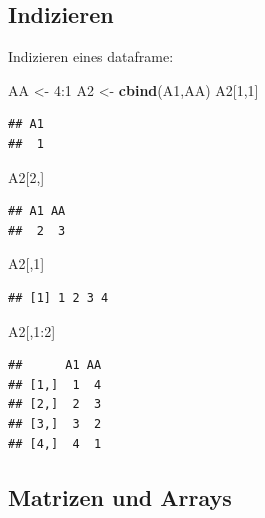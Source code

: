 \documentclass[]{article}
\newenvironment{Shaded}{\begin{snugshade}}{\end{snugshade}}
\newcommand{\KeywordTok}[1]{\textcolor[rgb]{0.13,0.29,0.53}{\textbf{{#1}}}}
\newcommand{\DecValTok}[1]{\textcolor[rgb]{0.00,0.00,0.81}{{#1}}}
\newcommand{\StringTok}[1]{\textcolor[rgb]{0.31,0.60,0.02}{{#1}}}
\newcommand{\NormalTok}[1]{{#1}}
\begin{document}
\subsection{Indizieren}\label{indizieren}

Indizieren eines dataframe:

\begin{Shaded}
\begin{Highlighting}[]
\NormalTok{AA <-}\StringTok{ }\DecValTok{4}\NormalTok{:}\DecValTok{1}
\NormalTok{A2 <-}\StringTok{ }\KeywordTok{cbind}\NormalTok{(A1,AA)}
\NormalTok{A2[}\DecValTok{1}\NormalTok{,}\DecValTok{1}\NormalTok{]}
\end{Highlighting}
\end{Shaded}

\begin{verbatim}
## A1 
##  1
\end{verbatim}

\begin{Shaded}
\begin{Highlighting}[]
\NormalTok{A2[}\DecValTok{2}\NormalTok{,]}
\end{Highlighting}
\end{Shaded}

\begin{verbatim}
## A1 AA 
##  2  3
\end{verbatim}

\begin{Shaded}
\begin{Highlighting}[]
\NormalTok{A2[,}\DecValTok{1}\NormalTok{]}
\end{Highlighting}
\end{Shaded}

\begin{verbatim}
## [1] 1 2 3 4
\end{verbatim}

\begin{Shaded}
\begin{Highlighting}[]
\NormalTok{A2[,}\DecValTok{1}\NormalTok{:}\DecValTok{2}\NormalTok{]}
\end{Highlighting}
\end{Shaded}

\begin{verbatim}
##      A1 AA
## [1,]  1  4
## [2,]  2  3
## [3,]  3  2
## [4,]  4  1
\end{verbatim}

\subsection{Matrizen und Arrays}\label{matrizen-und-arrays}
\end{document}
